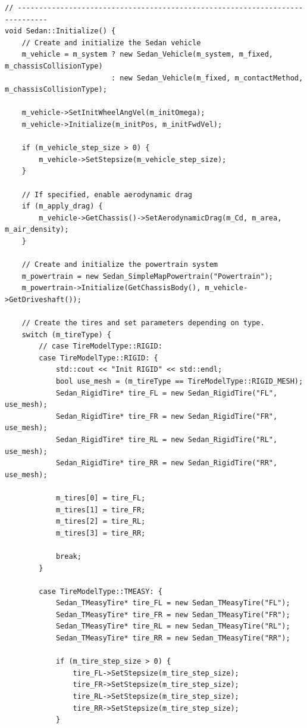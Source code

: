 \begin{lstlisting}
// -----------------------------------------------------------------------------
void Sedan::Initialize() {
    // Create and initialize the Sedan vehicle
    m_vehicle = m_system ? new Sedan_Vehicle(m_system, m_fixed, m_chassisCollisionType)
                         : new Sedan_Vehicle(m_fixed, m_contactMethod, m_chassisCollisionType);

    m_vehicle->SetInitWheelAngVel(m_initOmega);
    m_vehicle->Initialize(m_initPos, m_initFwdVel);

    if (m_vehicle_step_size > 0) {
        m_vehicle->SetStepsize(m_vehicle_step_size);
    }

    // If specified, enable aerodynamic drag
    if (m_apply_drag) {
        m_vehicle->GetChassis()->SetAerodynamicDrag(m_Cd, m_area, m_air_density);
    }

    // Create and initialize the powertrain system
    m_powertrain = new Sedan_SimpleMapPowertrain("Powertrain");
    m_powertrain->Initialize(GetChassisBody(), m_vehicle->GetDriveshaft());

    // Create the tires and set parameters depending on type.
    switch (m_tireType) {
        // case TireModelType::RIGID:
        case TireModelType::RIGID: {
            std::cout << "Init RIGID" << std::endl;
            bool use_mesh = (m_tireType == TireModelType::RIGID_MESH);
            Sedan_RigidTire* tire_FL = new Sedan_RigidTire("FL", use_mesh);
            Sedan_RigidTire* tire_FR = new Sedan_RigidTire("FR", use_mesh);
            Sedan_RigidTire* tire_RL = new Sedan_RigidTire("RL", use_mesh);
            Sedan_RigidTire* tire_RR = new Sedan_RigidTire("RR", use_mesh);

            m_tires[0] = tire_FL;
            m_tires[1] = tire_FR;
            m_tires[2] = tire_RL;
            m_tires[3] = tire_RR;

            break;
        }

        case TireModelType::TMEASY: {
            Sedan_TMeasyTire* tire_FL = new Sedan_TMeasyTire("FL");
            Sedan_TMeasyTire* tire_FR = new Sedan_TMeasyTire("FR");
            Sedan_TMeasyTire* tire_RL = new Sedan_TMeasyTire("RL");
            Sedan_TMeasyTire* tire_RR = new Sedan_TMeasyTire("RR");

            if (m_tire_step_size > 0) {
                tire_FL->SetStepsize(m_tire_step_size);
                tire_FR->SetStepsize(m_tire_step_size);
                tire_RL->SetStepsize(m_tire_step_size);
                tire_RR->SetStepsize(m_tire_step_size);
            }


\end{lstlisting}
